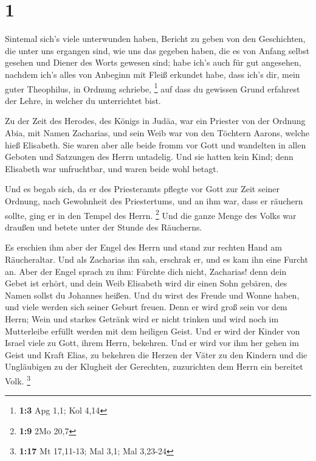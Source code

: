 \hypertarget{section}{%
\section{1}\label{section}}

 Sintemal sich's viele unterwunden haben, Bericht zu geben
von den Geschichten, die unter uns ergangen sind,  wie uns
das gegeben haben, die es von Anfang selbst gesehen und Diener des Worts
gewesen sind;  habe ich's auch für gut angesehen, nachdem
ich's alles von Anbeginn mit Fleiß erkundet habe, dass ich's dir, mein
guter Theophilus, in Ordnung schriebe, \footnote{\textbf{1:3} Apg 1,1;
  Kol 4,14}  auf dass du gewissen Grund erfahrest der
Lehre, in welcher du unterrichtet bist.

 Zu der Zeit des Herodes, des Königs in Judäa, war ein
Priester von der Ordnung Abia, mit Namen Zacharias, und sein Weib war
von den Töchtern Aarons, welche hieß Elisabeth.  Sie waren
aber alle beide fromm vor Gott und wandelten in allen Geboten und
Satzungen des Herrn untadelig.  Und sie hatten kein Kind;
denn Elisabeth war unfruchtbar, und waren beide wohl betagt.

 Und es begab sich, da er des Priesteramts pflegte vor
Gott zur Zeit seiner Ordnung,  nach Gewohnheit des
Priestertums, und an ihm war, dass er räuchern sollte, ging er in den
Tempel des Herrn. \footnote{\textbf{1:9} 2Mo 20,7}  Und
die ganze Menge des Volks war draußen und betete unter der Stunde des
Räucherns.

 Es erschien ihm aber der Engel des Herrn und stand zur
rechten Hand am Räucheraltar.  Und als Zacharias ihn sah,
erschrak er, und es kam ihn eine Furcht an.  Aber der
Engel sprach zu ihm: Fürchte dich nicht, Zacharias! denn dein Gebet ist
erhört, und dein Weib Elisabeth wird dir einen Sohn gebären, des Namen
sollst du Johannes heißen.  Und du wirst des Freude und
Wonne haben, und viele werden sich seiner Geburt freuen. 
Denn er wird groß sein vor dem Herrn; Wein und starkes Getränk wird er
nicht trinken und wird noch im Mutterleibe erfüllt werden mit dem
heiligen Geist.  Und er wird der Kinder von Israel viele
zu Gott, ihrem Herrn, bekehren.  Und er wird vor ihm her
gehen im Geist und Kraft Elias, zu bekehren die Herzen der Väter zu den
Kindern und die Ungläubigen zu der Klugheit der Gerechten, zuzurichten
dem Herrn ein bereitet Volk. \footnote{\textbf{1:17} Mt 17,11-13; Mal
  3,1; Mal 3,23-24}

